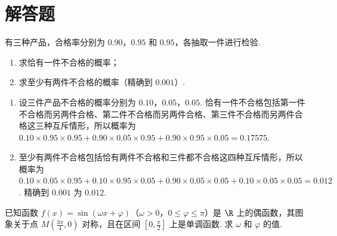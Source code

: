 \section{解答题}
\begin{problem}
有三种产品，合格率分别为 \(0.90\)，\(0.95\) 和 \(0.95\)，各抽取一件进行检验.

\begin{enumerate}
\item 求恰有一件不合格的概率；
\item 求至少有两件不合格的概率（精确到 \(0.001\)）.
\end{enumerate}
\end{problem}

\begin{solution}
\begin{enumerate}
\item 设三件产品不合格的概率分别为 \(0.10\)，\(0.05\)，\(0.05\). 恰有一件不合格包括第一件不合格而另两件合格、第二件不合格而另两件合格、第三件不合格而另两件合格这三种互斥情形，所以概率为 \(0.10\times0.95\times0.95+0.90\times0.05\times0.95+0.90\times0.95\times0.05=0.17575\).
\item 至少有两件不合格包括恰有两件不合格和三件都不合格这四种互斥情形，所以概率为 \(0.10\times0.05\times0.95+0.10\times0.95\times0.05+0.90\times0.05\times0.05+0.10\times0.05\times0.05=0.012\). 精确到 \(0.001\) 为 \(0.012\).
\end{enumerate}
\end{solution}

\begin{problem}
已知函数 \( f(x) = \sin (\omega x + \varphi) \)（\(\omega > 0\)，\(0 \leqslant \varphi \leqslant \pi\)）是 \(\R\) 上的偶函数，其图象关于点 \( M\left(\frac{3\pi}{4}, 0\right) \) 对称，且在区间 \(\left[0, \frac{\pi}{2}\right] \) 上是单调函数. 求 \(\omega\) 和 \(\varphi\) 的值.
\end{problem}

